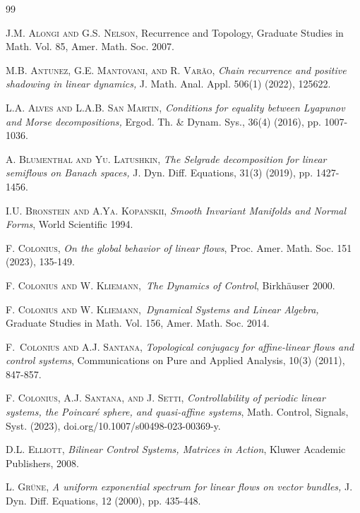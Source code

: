 	\begin{thebibliography}{99}                                                                                               %
		
		
		\textsc{J.M. Alongi and G.S. Nelson,} Recurrence and
		Topology, Graduate Studies in Math. Vol. 85, Amer. Math. Soc. 2007.
		
		\textsc{M.B. Antunez, G.E. Mantovani, and R. Var\~{a}o,}
		\emph{Chain recurrence and positive shadowing in linear dynamics, }J. Math.
		Anal. Appl. 506(1) (2022), 125622.
		
		\textsc{L.A. Alves and L.A.B. San Martin,} \emph{Conditions
			for equality between Lyapunov and Morse decompositions,} Ergod. Th. \& Dynam.
		Sys., 36(4) (2016), pp. 1007-1036.
		
		\textsc{A. Blumenthal and Yu. Latushkin, }\emph{The Selgrade
			decomposition for linear semiflows on Banach spaces,} J. Dyn. Diff. Equations,
		31(3) (2019), pp. 1427-1456.
		
		\textsc{I.U. Bronstein and A.Ya. Kopanskii,} \emph{Smooth
			Invariant Manifolds and Normal Forms}, World Scientific 1994.
		
		\textsc{F. Colonius,} \emph{On the global behavior of linear
			flows}, Proc. Amer. Math. Soc. 151 (2023), 135-149.
		
		\textsc{F. Colonius and W. Kliemann,}\emph{\ The Dynamics of
			Control}, Birkh\"{a}user 2000.
		
		\textsc{F. Colonius and W. Kliemann,}\emph{\ Dynamical
			Systems and Linear Algebra, }Graduate Studies in Math. Vol. 156, Amer. Math.
		Soc. 2014.
		
		\textsc{F.~Colonius and A.J. Santana}, \emph{Topological
			conjugacy for affine-linear flows and control systems}, Communications on Pure
		and Applied Analysis, 10(3) (2011), 847-857.
		
		\textsc{F. Colonius, A.J. Santana, and J. Setti,}
		\emph{Controllability of periodic linear systems, the Poincar\'{e} sphere, and
			quasi-affine systems}, Math. Control, Signals, Syst. (2023), doi.org/10.1007/s00498-023-00369-y.
		
		\textsc{D.L. Elliott,} \emph{Bilinear Control Systems,
			Matrices in Action}, Kluwer Academic Publishers, 2008.
		
		\textsc{L. Gr\"{u}ne,} \emph{A uniform exponential spectrum
			for linear flows on vector bundles,} J. Dyn. Diff. Equations, 12 (2000), pp. 435-448.
		

\end{thebibliography}

